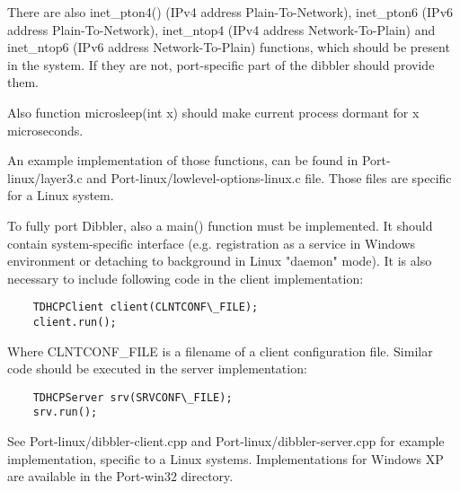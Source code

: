 There are also inet\_pton4() (IPv4 address Plain-To-Network), inet\_pton6
(IPv6 address Plain-To-Network), inet\_ntop4 (IPv4 address Network-To-Plain)
and inet\_ntop6 (IPv6 address Network-To-Plain) functions, which should be
present in the system. If they are not, port-specific part of the dibbler
should provide them.

Also function microsleep(int x) should make current process dormant for x
microseconds.

An example implementation of those functions, can be found in
Port-linux/layer3.c and Port-linux/lowlevel-options-linux.c file. Those
files are specific for a Linux system.

To fully port Dibbler, also a main() function must be implemented. It should
contain system-specific interface (e.g. registration as a service in Windows
environment or detaching to background in Linux "daemon" mode).
It is also necessary to include following code in the client implementation:

\begin{verbatim}
    TDHCPClient client(CLNTCONF\_FILE);
    client.run();
\end{verbatim}

Where CLNTCONF\_FILE is a filename of a client configuration file. Similar
code should be executed in the server implementation:

\begin{verbatim}
    TDHCPServer srv(SRVCONF\_FILE);
    srv.run();
\end{verbatim}

See Port-linux/dibbler-client.cpp and Port-linux/dibbler-server.cpp for
example implementation, specific to a Linux systems. Implementations for
Windows XP are available in the Port-win32 directory.
